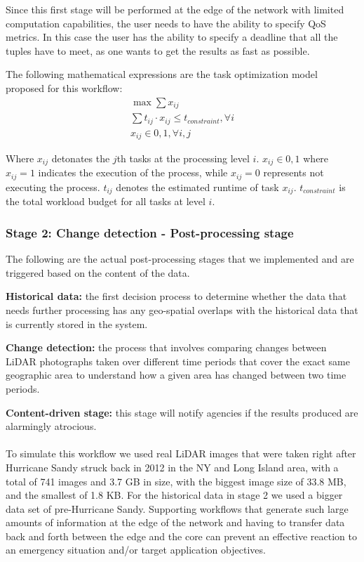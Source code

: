 Since this first stage will be performed at the edge of the network with limited computation capabilities, the user needs to have the ability to specify QoS metrics. In this case the user has the ability to specify a deadline that all the tuples have to meet, as one wants to get the results as fast as possible. 

The following mathematical expressions are the task optimization model proposed for this workflow:
\begin{equation}
\begin{split}
\max \sum x_{ij}
\\
\sum t_{ij} \cdot x_{ij} \leq t_{constraint} , \forall i
\\
x_{ij} \in {0,1}, \forall i,j
\end{split}
\end{equation}

\noindent Where $x_{ij}$ detonates the $j$th tasks at the processing level $i$. $x_{ij} \in {0,1}$ where $x_{ij} = 1$ indicates the execution of the process, while $x_{ij} = 0$ represents not executing the process. $t_{ij}$ denotes the estimated runtime of task $x_{ij}$. $t_{constraint}$ is the total workload budget for all tasks at level $i$.

\subsubsection{Stage 2: Change detection - Post-processing stage}
The following are the actual post-processing stages that we implemented and are triggered based on the content of the data.

\noindent\textbf{Historical data:} the first decision process to determine whether the data that needs further processing has any geo-spatial overlaps with the historical data that is currently stored in the system.

\noindent\textbf{Change detection:} the process that involves comparing changes between LiDAR photographs taken over different time periods that cover the exact same geographic area to understand how a given area has changed between two time periods. 

\noindent\textbf{Content-driven stage:} this stage will notify agencies if the results produced are alarmingly atrocious. 
\\
\\
\noindent To simulate this workflow we used real LiDAR images that were taken right after Hurricane Sandy struck back in 2012 in the NY and Long Island area, with a total of 741 images and 3.7 GB in size, with the biggest image size of 33.8 MB, and the smallest of 1.8 KB. For the historical data in stage 2 we used a bigger data set of pre-Hurricane Sandy. Supporting workflows that generate such large amounts of information at the edge of the network and having to transfer data back and forth between the edge and the core can prevent an effective reaction to an emergency situation and/or target application objectives.


